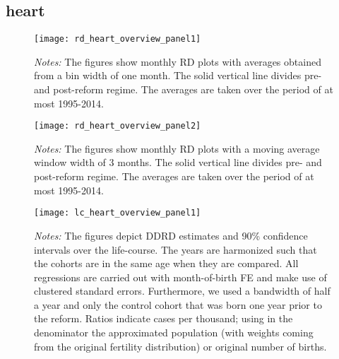 \subsection{heart}
\begin{landscape}
\begin{figure}[H]
	\centering
	\begin{minipage}{.95\linewidth}
	\texttt{[image: rd\_heart\_overview\_panel1]}
	{\scriptsize \emph{Notes:} The figures show monthly RD plots with averages obtained from a bin width of one month. The solid vertical line divides pre- and post-reform regime. The averages are taken over the period of at most 1995-2014. \par}
\end{minipage}
\end{figure}
\end{landscape}
\begin{landscape}
\begin{figure}[H]
	\centering
\begin{minipage}{.95\linewidth}
	\texttt{[image: rd\_heart\_overview\_panel2]}
	{\scriptsize \emph{Notes:} The figures show monthly RD plots with a moving average window width of 3 months. The solid vertical line divides pre- and post-reform regime. The averages are taken over the period of at most 1995-2014. \par}
\end{minipage}
\end{figure}
\end{landscape}


\begin{landscape}
\begin{figure}[H]
\centering
\begin{minipage}{.9\linewidth}
\texttt{[image: lc\_heart\_overview\_panel1]}
{\scriptsize \emph{Notes:} The figures depict DDRD estimates and 90\% confidence intervals over the life-course. The years are harmonized such that the cohorts are in the same age when they are compared. All regressions are carried out with month-of-birth FE and make use of clustered standard errors. Furthermore, we used a bandwidth of half a year and only the control cohort that was born one year prior to the reform. Ratios indicate cases per thousand; using in the denominator the approximated population (with weights coming from the original fertility distribution) or original number of births. \par}
\end{minipage}
\end{figure}
\end{landscape}
